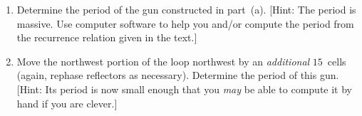\begin{multicols}{2}
\begin{problemstar}
\begin{enumerate}[label=\bf\color{ocre}(\alph*)]
			\item {} Determine the period of the gun constructed in part~(a). [Hint: The period is massive. Use computer software to help you and/or compute the period from the recurrence relation given in the text.]
			
			\item {} Move the northwest portion of the loop northwest by an \emph{additional} $15$~cells (again, rephase reflectors as necessary). Determine the period of this gun. [Hint: Its period is now small enough that you \emph{may} be able to compute it by hand if you are clever.]
		\end{enumerate}
	\end{problemstar}

\vspace*{7cm}${}$%
	
	
	
	
	
	
\end{multicols}
\normalsize\vspace*{0.01cm}\ifdefined\FORPRINTING{}\else%
\fi
